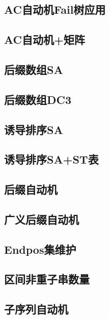 \documentclass{article}
\begin{document}
\subsection{AC自动机Fail树应用} 
 
\subsection{AC自动机+矩阵} 
 

\subsection{后缀数组SA} 
 
\subsection{后缀数组DC3} 
 
\subsection{诱导排序SA} 
 
\subsection{诱导排序SA+ST表} 
 

\subsection{后缀自动机} 

\subsection{广义后缀自动机} 

\subsection{Endpos集维护} 

\subsection{区间非重子串数量} 


\subsection{子序列自动机} 

\end{document}
